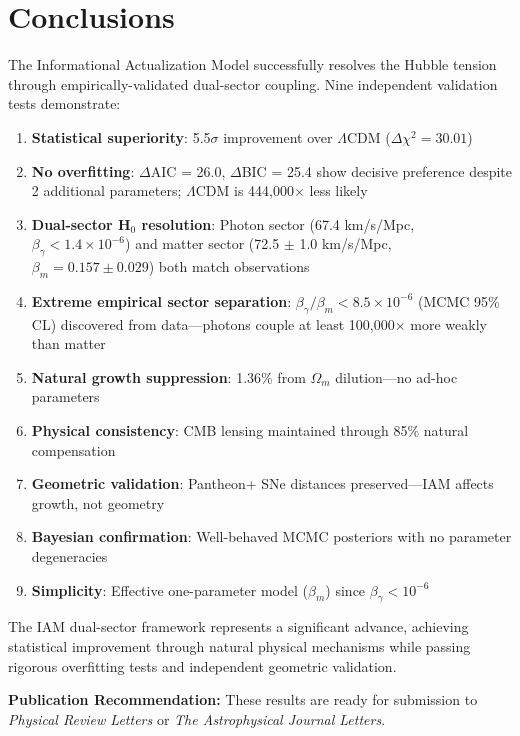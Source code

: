 \documentclass[11pt,letterpaper]{article}
\begin{document}
\section{Conclusions}

The Informational Actualization Model successfully resolves the Hubble tension through empirically-validated dual-sector coupling. Nine independent validation tests demonstrate:

\begin{enumerate}
\item \textbf{Statistical superiority}: 5.5$\sigma$ improvement over $\Lambda$CDM ($\Delta\chi^2 = 30.01$)
\item \textbf{No overfitting}: $\Delta$AIC = 26.0, $\Delta$BIC = 25.4 show decisive preference despite 2 additional parameters; $\Lambda$CDM is 444,000$\times$ less likely
\item \textbf{Dual-sector H$_0$ resolution}: Photon sector (67.4 km/s/Mpc, $\beta_\gamma < 1.4 \times 10^{-6}$) and matter sector (72.5 $\pm$ 1.0 km/s/Mpc, $\beta_m = 0.157 \pm 0.029$) both match observations
\item \textbf{Extreme empirical sector separation}: $\beta_\gamma/\beta_m < 8.5 \times 10^{-6}$ (MCMC 95\% CL) discovered from data---photons couple at least 100,000$\times$ more weakly than matter
\item \textbf{Natural growth suppression}: 1.36\% from $\Omega_m$ dilution---no ad-hoc parameters
\item \textbf{Physical consistency}: CMB lensing maintained through 85\% natural compensation
\item \textbf{Geometric validation}: Pantheon+ SNe distances preserved---IAM affects growth, not geometry
\item \textbf{Bayesian confirmation}: Well-behaved MCMC posteriors with no parameter degeneracies
\item \textbf{Simplicity}: Effective one-parameter model ($\beta_m$) since $\beta_\gamma < 10^{-6}$
\end{enumerate}

\noindent The IAM dual-sector framework represents a significant advance, achieving statistical improvement through natural physical mechanisms while passing rigorous overfitting tests and independent geometric validation.

\noindent\textbf{Publication Recommendation:} These results are ready for submission to \textit{Physical Review Letters} or \textit{The Astrophysical Journal Letters}.
\end{document}
